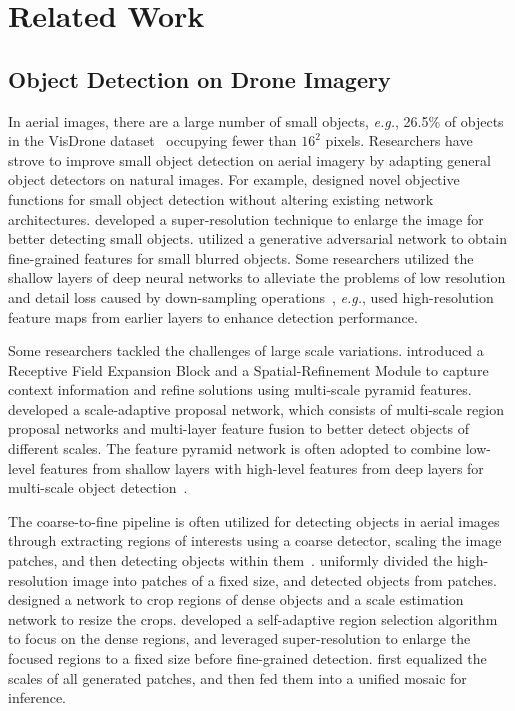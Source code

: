 \documentclass[letterpaper]{article} %
\def \eg {\emph{e.g.}}
\begin{document}
\section{Related Work}
\label{sec: related-work}
\subsection{Object Detection on Drone Imagery}
In aerial images, there are a large number of small objects, \eg, 26.5\% of objects in the VisDrone dataset~\cite{Zhu_2022_VisDrone} occupying fewer than $16^2$ pixels. Researchers have strove to improve small object detection on aerial imagery by adapting general object detectors on natural images. For example, \citet{Cheng_2019_Learning} designed novel objective functions for small object detection without altering existing network architectures. \citet{Li_2017_Perceptual} developed a super-resolution technique to enlarge the image for better detecting small objects. \citet{Bai_2018_SODMTGAN} utilized a generative adversarial network to obtain fine-grained features for small blurred objects. Some researchers utilized the shallow layers of deep neural networks to alleviate the problems of low resolution and detail loss caused by down-sampling operations~\cite{Bouguettaya_2022_review}, \eg, \citet{Sommer_2017_Fast} used high-resolution feature maps from earlier layers to enhance detection performance.

Some researchers tackled the challenges of large scale variations. \citet{Wang_2019_Spatial} introduced a Receptive Field Expansion Block and a Spatial-Refinement Module to capture context information and refine solutions using multi-scale pyramid features. \citet{Zhang_2019_Scale} developed a scale-adaptive proposal network, which consists of multi-scale region proposal networks and multi-layer feature fusion to better detect objects of different scales. The feature pyramid network is often adopted to combine low-level features from shallow layers with high-level features from deep layers for multi-scale object detection~\cite{Zhou_2019_SAICFPN}.


The coarse-to-fine pipeline is often utilized for detecting objects in aerial images through extracting regions of interests using a coarse detector, scaling the image patches, and then detecting objects within them~\cite{Bouguettaya_2022_review}. \citet{Unel_2019_TilingSOD} uniformly divided the high-resolution image into patches of a fixed size, and detected objects from patches. \citet{Yang_2019_Clustered} designed a network to crop regions of dense objects and a scale estimation network to resize the crops. \citet{Xu_2022_AdaZoom} developed a self-adaptive region selection algorithm to focus on the dense regions, and leveraged super-resolution to enlarge the focused regions to a fixed size before fine-grained detection. \citet{Huang_2022_UFPMP} first equalized the scales of all generated patches, and then fed them into a unified mosaic for inference.
\end{document}
